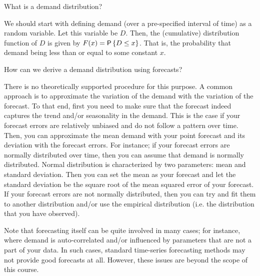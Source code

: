 \begin{exercise}
What is a demand distribution?


\begin{solution}
We should start with defining demand (over a pre-specified interval of time) as a random variable. Let this variable be $D$. Then, the (cumulative) distribution function of $D$ is given by $F(x)=\P{D\leq x}$. That is, the probability that demand being less than or equal to some constant $x$. 
\end{solution}
\end{exercise}

\begin{exercise}
How can we derive a demand distribution using forecasts? 


\begin{solution}
There is no theoretically supported procedure for this purpose. A common approach is to approximate the variation of the demand with the variation of the forecast. To that end, first you need to make sure that the forecast indeed captures the trend and/or seasonality in the demand. This is the case if your forecast errors are relatively unbiased and do not follow a pattern over time. Then, you can approximate the mean demand with your point forecast and its deviation with the forecast errors. For instance; if your forecast errors are normally distributed over time, then you can assume that demand is normally distributed. Normal distribution is characterized by two parameters: mean and standard deviation. Then you can set the mean as your forecast and let the standard deviation be the square root of the mean squared error of your forecast. If your forecast errors are not normally distributed, then you can try and fit them to another distribution and/or use the empirical distribution (i.e. the distribution that you have observed). 

Note that forecasting itself can be quite involved in many cases; for instance, where demand is auto-correlated and/or influenced by parameters that are not a part of your data. In such cases, standard time-series forecasting methods may not provide good forecasts at all. However, these issues are beyond the scope of this course. 
\end{solution}
\end{exercise}

